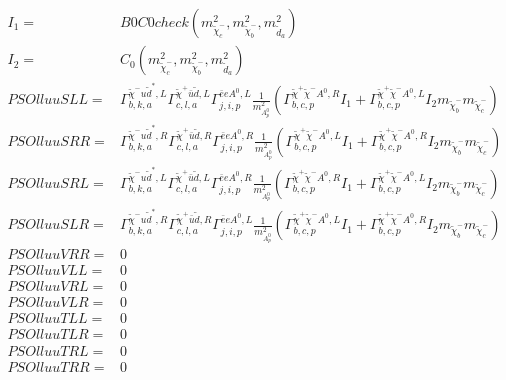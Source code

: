 \documentclass[A4,landscape]{article}
\begin{document}
\begin{align} 
I_1= & B0C0check(m^2_{\tilde{\chi}^-_{{c}}}, m^2_{\tilde{\chi}^-_{{b}}}, m^2_{\tilde{d}_{{a}}}) \\ 
I_2= & C_0(m^2_{\tilde{\chi}^-_{{c}}}, m^2_{\tilde{\chi}^-_{{b}}}, m^2_{\tilde{d}_{{a}}}) \\ 
  PSOlluuSLL= &  \Gamma^{\tilde{\chi}^- u \tilde{d}^*,L}_{b, k, a} \Gamma^{\tilde{\chi}^+\bar{u}\tilde{d} ,L}_{c, l, a} \Gamma^{\bar{e}e A^0 ,L}_{j, i, p} \frac{1}{m^2_{A^0_{{p}}}} (\Gamma^{\tilde{\chi}^+\tilde{\chi}^- A^0 ,R}_{b, c, p} I_1 + \Gamma^{\tilde{\chi}^+\tilde{\chi}^- A^0 ,L}_{b, c, p} I_2 m_{\tilde{\chi}^-_{{b}}} m_{\tilde{\chi}^-_{{c}}}) \\ 
  PSOlluuSRR= &  \Gamma^{\tilde{\chi}^- u \tilde{d}^*,R}_{b, k, a} \Gamma^{\tilde{\chi}^+\bar{u}\tilde{d} ,R}_{c, l, a} \Gamma^{\bar{e}e A^0 ,R}_{j, i, p} \frac{1}{m^2_{A^0_{{p}}}} (\Gamma^{\tilde{\chi}^+\tilde{\chi}^- A^0 ,L}_{b, c, p} I_1 + \Gamma^{\tilde{\chi}^+\tilde{\chi}^- A^0 ,R}_{b, c, p} I_2 m_{\tilde{\chi}^-_{{b}}} m_{\tilde{\chi}^-_{{c}}}) \\ 
  PSOlluuSRL= &  \Gamma^{\tilde{\chi}^- u \tilde{d}^*,L}_{b, k, a} \Gamma^{\tilde{\chi}^+\bar{u}\tilde{d} ,L}_{c, l, a} \Gamma^{\bar{e}e A^0 ,R}_{j, i, p} \frac{1}{m^2_{A^0_{{p}}}} (\Gamma^{\tilde{\chi}^+\tilde{\chi}^- A^0 ,R}_{b, c, p} I_1 + \Gamma^{\tilde{\chi}^+\tilde{\chi}^- A^0 ,L}_{b, c, p} I_2 m_{\tilde{\chi}^-_{{b}}} m_{\tilde{\chi}^-_{{c}}}) \\ 
  PSOlluuSLR= &  \Gamma^{\tilde{\chi}^- u \tilde{d}^*,R}_{b, k, a} \Gamma^{\tilde{\chi}^+\bar{u}\tilde{d} ,R}_{c, l, a} \Gamma^{\bar{e}e A^0 ,L}_{j, i, p} \frac{1}{m^2_{A^0_{{p}}}} (\Gamma^{\tilde{\chi}^+\tilde{\chi}^- A^0 ,L}_{b, c, p} I_1 + \Gamma^{\tilde{\chi}^+\tilde{\chi}^- A^0 ,R}_{b, c, p} I_2 m_{\tilde{\chi}^-_{{b}}} m_{\tilde{\chi}^-_{{c}}}) \\ 
  PSOlluuVRR= & 0 \\ 
  PSOlluuVLL= & 0 \\ 
  PSOlluuVRL= & 0 \\ 
  PSOlluuVLR= & 0 \\ 
  PSOlluuTLL= & 0 \\ 
  PSOlluuTLR= & 0 \\ 
  PSOlluuTRL= & 0 \\ 
  PSOlluuTRR= & 0 \\ 
\end{align} 
\end{document}
